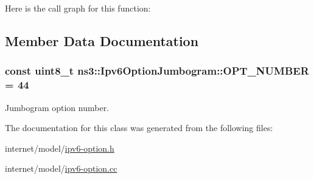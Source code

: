 Here is the call graph for this function\+:




\subsection{Member Data Documentation}
\subsubsection[{\texorpdfstring{O\+P\+T\+\_\+\+N\+U\+M\+B\+ER}{OPT_NUMBER}}]{\setlength{\rightskip}{0pt plus 5cm}const uint8\+\_\+t ns3\+::\+Ipv6\+Option\+Jumbogram\+::\+O\+P\+T\+\_\+\+N\+U\+M\+B\+ER = 44\hspace{0.3cm}{\ttfamily [static]}}\hypertarget{classns3_1_1Ipv6OptionJumbogram_ada4eab6e1b65027aafdc18b31db7d7c9}{}\label{classns3_1_1Ipv6OptionJumbogram_ada4eab6e1b65027aafdc18b31db7d7c9}


Jumbogram option number. 



The documentation for this class was generated from the following files\+:\begin{DoxyCompactItemize}
\item 
internet/model/\hyperlink{ipv6-option_8h}{ipv6-\/option.\+h}\item 
internet/model/\hyperlink{ipv6-option_8cc}{ipv6-\/option.\+cc}\end{DoxyCompactItemize}

